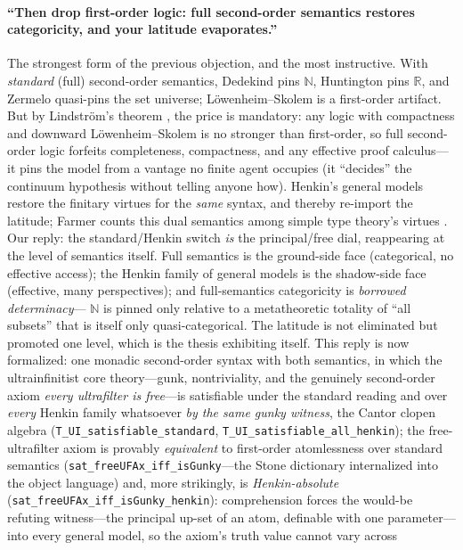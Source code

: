 \documentclass[]{article}
\theoremstyle{definition}
\theoremstyle{remark}
\newcommand{\code}[1]{\texttt{#1}}
\newcommand{\R}{\mathbb{R}}
\newcommand{\N}{\mathbb{N}}
\begin{document}
\paragraph{``Then drop first-order logic: full second-order semantics restores
categoricity, and your latitude evaporates.''} The strongest form of the previous
objection, and the most instructive. With \emph{standard} (full) second-order
semantics, Dedekind pins $\N$, Huntington pins $\R$, and Zermelo quasi-pins the
set universe; L\"owenheim--Skolem is a first-order artifact. But by Lindstr\"om's
theorem \cite{Lindstrom1969}, the price is mandatory: any logic with compactness
and downward L\"owenheim--Skolem is no stronger than first-order, so full
second-order logic forfeits completeness, compactness, and any effective proof
calculus---it pins the model from a vantage no finite agent occupies (it
``decides'' the continuum hypothesis without telling anyone how). Henkin's general
models \cite{Henkin1950} restore the finitary virtues for the \emph{same} syntax,
and thereby re-import the latitude; Farmer counts this dual semantics among simple
type theory's virtues \cite{Farmer2008}. Our reply: the standard/Henkin switch
\emph{is} the principal/free dial, reappearing at the level of semantics itself.
Full semantics is the ground-side face (categorical, no effective access); the
Henkin family of general models is the shadow-side face (effective, many
perspectives); and full-semantics categoricity is \emph{borrowed determinacy}---%
$\N$ is pinned only relative to a metatheoretic totality of ``all subsets'' that is
itself only quasi-categorical. The latitude is not eliminated but promoted one
level, which is the thesis exhibiting itself. This reply is now formalized: one
monadic second-order syntax with both semantics, in which the ultrainfinitist core
theory---gunk, nontriviality, and the genuinely second-order axiom \emph{every
ultrafilter is free}---is satisfiable under the standard reading and over
\emph{every} Henkin family whatsoever \emph{by the same gunky witness}, the Cantor
clopen algebra (\code{T\_UI\_satisfiable\_standard},
\code{T\_UI\_satisfiable\_all\_henkin}); the free-ultrafilter axiom is provably
\emph{equivalent} to first-order atomlessness over standard semantics
(\code{sat\_freeUFAx\_iff\_isGunky}---the Stone dictionary internalized into the
object language) and, more strikingly, is \emph{Henkin-absolute}
(\code{sat\_freeUFAx\_iff\_isGunky\_henkin}): comprehension forces the would-be
refuting witness---the principal up-set of an atom, definable with one
parameter---into every general model, so the axiom's truth value cannot vary across
\end{document}
